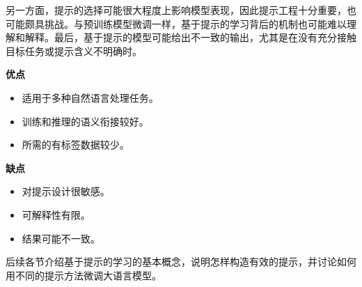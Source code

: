 另一方面，提示的选择可能很大程度上影响模型表现，因此提示工程十分重要，也可能颇具挑战。与预训练模型微调一样，基于提示的学习背后的机制也可能难以理解和解释。最后，基于提示的模型可能给出不一致的输出，尤其是在没有充分接触目标任务或提示含义不明确时。

\begin{keypoint}
\noindent\textbf{优点}
\begin{itemize}
\item 适用于多种自然语言处理任务。
\item 训练和推理的语义衔接较好。
\item 所需的有标签数据较少。
\end{itemize}
\noindent\textbf{缺点}
\begin{itemize}
\item 对提示设计很敏感。
\item 可解释性有限。
\item 结果可能不一致。
\end{itemize}
\end{keypoint}

后续各节介绍基于提示的学习的基本概念，说明怎样构造有效的提示，并讨论如何用不同的提示方法微调大语言模型。










